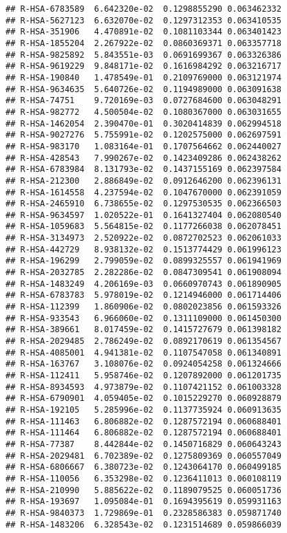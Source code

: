\documentclass[
]{article}
\begin{document}
\begin{verbatim}
## R-HSA-6783589  6.642320e-02  0.1298855290 0.063462332
## R-HSA-5627123  6.632070e-02  0.1297312353 0.063410535
## R-HSA-351906   4.470891e-02  0.1081103344 0.063401423
## R-HSA-1855204  2.267922e-02  0.0860369371 0.063357718
## R-HSA-9825892  5.843551e-03  0.0691699367 0.063326386
## R-HSA-9619229  9.848171e-02  0.1616984292 0.063216717
## R-HSA-190840   1.478549e-01  0.2109769000 0.063121974
## R-HSA-9634635  5.640726e-02  0.1194989000 0.063091638
## R-HSA-74751    9.720169e-03  0.0727684600 0.063048291
## R-HSA-982772   4.500504e-02  0.1080367000 0.063031655
## R-HSA-1462054  2.390470e-01  0.3020414839 0.062994518
## R-HSA-9027276  5.755991e-02  0.1202575000 0.062697591
## R-HSA-983170   1.083164e-01  0.1707564662 0.062440027
## R-HSA-428543   7.990267e-02  0.1423409286 0.062438262
## R-HSA-6783984  8.131793e-02  0.1437155169 0.062397584
## R-HSA-212300   2.886849e-02  0.0912646200 0.062396131
## R-HSA-1614558  4.237594e-02  0.1047670000 0.062391059
## R-HSA-2465910  6.738655e-02  0.1297530535 0.062366503
## R-HSA-9634597  1.020522e-01  0.1641327404 0.062080540
## R-HSA-1059683  5.564815e-02  0.1177266038 0.062078451
## R-HSA-3134973  2.520922e-02  0.0872702523 0.062061033
## R-HSA-442729   8.938132e-02  0.1513774429 0.061996123
## R-HSA-196299   2.799059e-02  0.0899325557 0.061941969
## R-HSA-2032785  2.282286e-02  0.0847309541 0.061908094
## R-HSA-1483249  4.206169e-03  0.0660970743 0.061890905
## R-HSA-6783783  5.978019e-02  0.1214946000 0.061714406
## R-HSA-112399   1.860906e-02  0.0802023856 0.061593326
## R-HSA-933543   6.966060e-02  0.1311109000 0.061450300
## R-HSA-389661   8.017459e-02  0.1415727679 0.061398182
## R-HSA-2029485  2.786249e-02  0.0892170619 0.061354567
## R-HSA-4085001  4.941381e-02  0.1107547058 0.061340891
## R-HSA-163767   3.108076e-02  0.0924054258 0.061324666
## R-HSA-112411   5.958746e-02  0.1207892000 0.061201735
## R-HSA-8934593  4.973879e-02  0.1107421152 0.061003328
## R-HSA-6790901  4.059405e-02  0.1015229270 0.060928879
## R-HSA-192105   5.285996e-02  0.1137735924 0.060913635
## R-HSA-111463   6.806882e-02  0.1287572194 0.060688401
## R-HSA-111464   6.806882e-02  0.1287572194 0.060688401
## R-HSA-77387    8.442844e-02  0.1450716829 0.060643243
## R-HSA-2029481  6.702389e-02  0.1275809369 0.060557049
## R-HSA-6806667  6.380723e-02  0.1243064170 0.060499185
## R-HSA-110056   6.353298e-02  0.1236411013 0.060108119
## R-HSA-210990   5.885622e-02  0.1189079525 0.060051736
## R-HSA-193697   1.095084e-01  0.1694395619 0.059931163
## R-HSA-9840373  1.729869e-01  0.2328586383 0.059871740
## R-HSA-1483206  6.328543e-02  0.1231514689 0.059866039

\end{verbatim}
\end{document}
